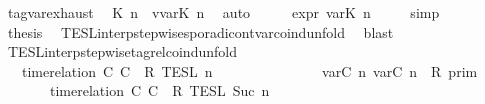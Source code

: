 \begin{isabellebody}
\ tag{\isacharunderscore}var{\isachardot}exhaust\ \isamarkupfalse%
\ K\ n\ \ {\isacartoucheopen}v{\isacharequal}{\isasymtau}\isactrlsub v\isactrlsub a\isactrlsub r{\isacharparenleft}K{\isacharcomma}\ n{\isacharparenright}{\isacartoucheclose}\ \isamarkupfalse%
\ auto\isanewline
\ \ \isamarkupfalse%
\ \isamarkupfalse%
\ {\isacartoucheopen}{\isasymtau}\isactrlsub e\isactrlsub x\isactrlsub p\isactrlsub r{\isacharequal}{\isasymlparr}\ {\isasymtau}\isactrlsub v\isactrlsub a\isactrlsub r{\isacharparenleft}K{\isacharcomma}\ n{\isacharparenright}\ {\isasymoplus}\ {\isasymtau}\ {\isasymrparr}{\isacartoucheclose}\ \isamarkupfalse%
\ simp\isanewline
\ \ \isamarkupfalse%
\ {\isacharquery}thesis\ \isamarkupfalse%
\ TESL{\isacharunderscore}interp{\isacharunderscore}stepwise{\isacharunderscore}sporadicon{\isacharunderscore}tvar{\isacharunderscore}coind{\isacharunderscore}unfold\ \isamarkupfalse%
\ blast\isanewline
{}\isamarkupfalse%
%
\endisatagproof
{\isafoldproof}%
%
\isadelimproof
\isanewline
%
\endisadelimproof
\isanewline
{}\isamarkupfalse%
\ TESL{\isacharunderscore}interp{\isacharunderscore}stepwise{\isacharunderscore}tagrel{\isacharunderscore}coind{\isacharunderscore}unfold{\isacharcolon}\isanewline
\ \ {\isacartoucheopen}{\isasymlbrakk}\ time{\isacharminus}relation\ {\isasymlfloor}C\ C\ {\isasymin}\ R\ {\isasymrbrakk}\isactrlsub T\isactrlsub E\isactrlsub S\isactrlsub L\isactrlbsup {\isasymge}\ n\isactrlesup \ {\isacharequal}\ \ \ \ \ \ \ \ %
\isanewline
\ \ \ \ \ {\isasymlbrakk}\ {\isasymlfloor}{\isasymtau}\isactrlsub v\isactrlsub a\isactrlsub r{\isacharparenleft}C\ n{\isacharparenright}{\isacharcomma}\ {\isasymtau}\isactrlsub v\isactrlsub a\isactrlsub r{\isacharparenleft}C\ n{\isacharparenright}{\isasymrfloor}\ {\isasymin}\ R\ {\isasymrbrakk}\isactrlsub p\isactrlsub r\isactrlsub i\isactrlsub m\isanewline
\ \ \ \ \ {\isasyminter}\ {\isasymlbrakk}\ time{\isacharminus}relation\ {\isasymlfloor}C\ C\ {\isasymin}\ R\ {\isasymrbrakk}\isactrlsub T\isactrlsub E\isactrlsub S\isactrlsub L\isactrlbsup {\isasymge}\ Suc\ n\isactrlesup {\isacartoucheclose}\isanewline
%
\isadelimproof
%
\endisadelimproof

\end{isabellebody}
